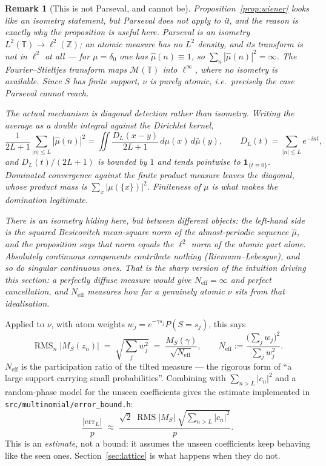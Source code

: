 \documentclass[11pt]{article}
\newtheorem{remark}{Remark}
\newcommand{\Neff}{N_{\mathrm{eff}}}
\begin{document}
\begin{remark}[This is not Parseval, and cannot be]
\label{rem:notparseval}
Proposition~\ref{prop:wiener} looks like an isometry statement, but Parseval does not apply to it,
and the reason is exactly why the proposition is useful here. Parseval is an isometry
$L^2(\mathbb T)\to\ell^2(\mathbb Z)$; an atomic measure has no $L^2$ density, and its transform is
not in $\ell^2$ at all --- for $\mu=\delta_0$ one has $\hat\mu(n)\equiv1$, so
$\sum_n|\hat\mu(n)|^2=\infty$. The Fourier--Stieltjes transform maps $\mathcal M(\mathbb T)$ into
$\ell^\infty$, where no isometry is available. Since $S$ has finite support, $\nu$ is purely atomic,
i.e.\ precisely the case Parseval cannot reach.

The actual mechanism is diagonal detection rather than isometry. Writing the average as a double
integral against the Dirichlet kernel,
\[
  \frac1{2L+1}\sum_{|n|\le L}|\hat\mu(n)|^2
  =\iint \frac{D_L(x-y)}{2L+1}\,d\mu(x)\,d\bar\mu(y),
  \qquad D_L(t)=\!\!\sum_{|n|\le L}\!\! e^{-int},
\]
and $D_L(t)/(2L+1)$ is bounded by $1$ and tends pointwise to $\mathbf 1_{\{t\equiv0\}}$. Dominated
convergence against the finite product measure leaves the diagonal, whose product mass is
$\sum_x|\mu(\{x\})|^2$. Finiteness of $\mu$ is what makes the domination legitimate.

There \emph{is} an isometry hiding here, but between different objects: the left-hand side is the
squared Besicovitch mean-square norm of the almost-periodic sequence $\hat\mu$, and the proposition
says that norm equals the $\ell^2$ norm of the \emph{atomic part alone}. Absolutely continuous
components contribute nothing (Riemann--Lebesgue), and so do singular continuous ones. That is the
sharp version of the intuition driving this section: a perfectly diffuse measure would give
$\Neff=\infty$ and perfect cancellation, and $\Neff$ measures how far a genuinely atomic $\nu$ sits
from that idealisation.
\end{remark}

Applied to $\nu$, with atom weights $w_j=e^{-\gamma s_j}P(S=s_j)$, this says
\[
  \operatorname{RMS}_n|M_S(z_n)|\;=\;\sqrt{\textstyle\sum_j w_j^2}\;=\;\frac{M_S(\gamma)}{\sqrt{\Neff}},
  \qquad
  \Neff:=\frac{\big(\sum_j w_j\big)^2}{\sum_j w_j^2}.
\]
$\Neff$ is the participation ratio of the tilted measure — the rigorous form of ``a large support
carrying small probabilities''. Combining with $\sum_{n>L}|c_n|^2$ and a random-phase model for the
unseen coefficients gives the estimate implemented in \texttt{src/multinomial/error\_bound.h}:
\begin{equation}
  \label{eq:estimate}
  \frac{|\mathrm{err}_L|}{p}\;\approx\;
  \frac{\sqrt2\;\operatorname{RMS}|M_S|\;\sqrt{\sum_{n>L}|c_n|^2}}{p}.
\end{equation}
This is an \emph{estimate}, not a bound: it assumes the unseen coefficients keep behaving like the
seen ones. Section~\ref{sec:lattice} is what happens when they do not.
\end{document}
